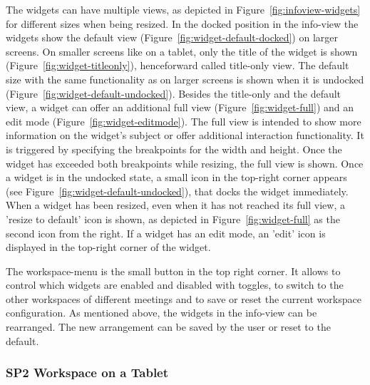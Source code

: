 \documentclass{sigchi}
\begin{document}
The widgets can have multiple views, as depicted in Figure~\ref{fig:infoview-widgets} for different sizes when being resized.
In the docked position in the info-view the widgets show the default view (Figure~\ref{fig:widget-default-docked}) on larger screens. 
On smaller screens like on a tablet, only the title of the widget is shown (Figure~\ref{fig:widget-titleonly}), henceforward called title-only view.
The default size with the same functionality as on larger screens is shown when it is undocked (Figure~\ref{fig:widget-default-undocked}).
Besides the title-only and the default view, a widget can offer an additional full view (Figure~\ref{fig:widget-full}) and an edit mode (Figure~\ref{fig:widget-editmode}).
The full view is intended to show more information on the widget's subject or offer additional interaction functionality.
It is triggered by specifying the breakpoints for the width and height.
Once the widget has exceeded both breakpoints while resizing, the full view is shown.
Once a widget is in the undocked state, a small icon in the top-right corner appears (see Figure~\ref{fig:widget-default-undocked}), that docks the widget immediately.
When a widget has been resized, even when it has not reached its full view, a 'resize to default' icon is shown, as depicted in Figure~\ref{fig:widget-full} as the second icon from the right.
If a widget has an edit mode, an 'edit' icon is displayed in the top-right corner of the widget.

The workspace-menu is the small button in the top right corner.
It allows to control which widgets are enabled and disabled with toggles, to switch to the other workspaces of different meetings and to save or reset the current workspace configuration.
As mentioned above, the widgets in the info-view can be rearranged.
The new arrangement can be saved by the user or reset to the default.


\subsubsection{SP2 Workspace on a Tablet}
\end{document}
